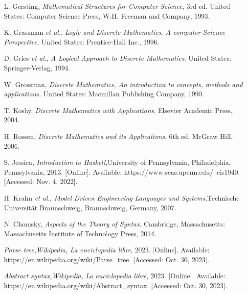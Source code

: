 \begin{thebibliography}{11}
    \label{sec:69}
    \hypertarget{69}{}
    L. Gersting, \textit{Mathematical Structures for Computer Science}, 3rd ed. United States: Computer Science Press, W.H. Freeman and Company, 1993.

    \label{sec:70}
    \hypertarget{70}{}
    K. Grassman \textit{et al.}, \textit{Logic and Discrete Mathematics, A computer Science Perspective}. United States: Prentice-Hall Inc., 1996.

    \label{sec:71}
    \hypertarget{71}{}
    D. Gries \textit{et al.}, \textit{A Logical Approach to Discrete Mathematics}. United States: Springer-Verlag, 1994.

    \label{sec:72}
    \hypertarget{72}{}
    W. Grossman, \textit{Discrete Mathematics, An introduction to concepts, methods and applications}. United States: Macmillan Publishing Company, 1990.

    \label{sec:73}
    \hypertarget{73}{}
    T. Koshy, \textit{Discrete Mathematics with Applications}. Elsevier Academic Press, 2004.

    \label{sec:74}
    \hypertarget{74}{}
    H. Rossen, \textit{Discrete Mathematics and its Applications}, 6th ed. McGraw Hill, 2006.

    \label{sec:75}
    \hypertarget{75}{}
    S. Jessica, \textit{Introduction to Haskell,}University of Pennsylvania, Philadelphia, Pennsylvania, 2013. [Online]. Available: https://www.seas.upenn.edu/~cis1940. [Accessed: Nov. 4, 2022].

    \label{sec:76}
    \hypertarget{76}{}
    H. Krahn \textit{et al.}, \textit{Model Driven Engineering Languages and Systems,}Technische Universität Braunschweig, Braunschweig, Germany, 2007.

    \label{sec:77}
    \hypertarget{77}{}
    N. Chomsky, \textit{Aspects of the Theory of Syntax}. Cambridge, Massachusetts: Massachusetts Institute of Technology Press, 2014.
    
    \label{sec:78}
    \hypertarget{78}{}
    \textit{Parse tree,}\textit{Wikipedia, La enciclopedia libre}, 2023. [Online]. Available: https://en.wikipedia.org/wiki/Parse\_tree. [Accessed: Oct. 30, 2023].

    \label{sec:79}
    \hypertarget{79}{}
    \textit{Abstract syntax,}\textit{Wikipedia, La enciclopedia libre}, 2023. [Online]. Available: https://en.wikipedia.org/wiki/Abstract\_syntax. [Accessed: Oct. 30, 2023].


\end{thebibliography}
